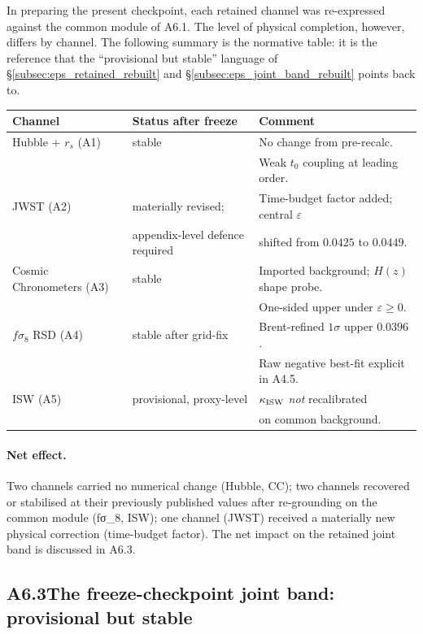 In preparing the present checkpoint, each retained channel was
re-expressed against the common module of A6.1. The level of
physical completion, however, differs by channel. The following
summary is the normative table: it is the reference that the
``provisional but stable'' language of
\S\ref{subsec:eps_retained_rebuilt} and
\S\ref{subsec:eps_joint_band_rebuilt} points back to.
\begin{center}
\begin{tabular}{|l|l|l|}
\hline
Channel & Status after freeze &
Comment \\
\hline
Hubble + $r_s$ (A1) &
stable &
No change from pre-recalc. \\
& & Weak $t_0$ coupling at leading order. \\
\hline
JWST (A2) &
materially revised; &
Time-budget factor added; central $\varepsilon$ \\
& appendix-level defence required &
 shifted from $0.0425$ to $0.0449$. \\
\hline
Cosmic Chronometers (A3) &
stable &
Imported background; $H(z)$ shape probe. \\
& & One-sided upper under $\varepsilon \geq 0$. \\
\hline
$f\sigma_8$ RSD (A4) &
stable after grid-fix &
Brent-refined $1\sigma$ upper
$0.0396$. \\
& & Raw negative best-fit explicit in A4.5. \\
\hline
ISW (A5) &
provisional, proxy-level &
$\kappa_{\rm ISW}$ \emph{not} recalibrated \\
& & on common background. \\
\hline
\end{tabular}
\end{center}
\paragraph{Net effect.}
Two channels carried no numerical change (Hubble, CC); two
channels recovered or stabilised at their previously published
values after re-grounding on the common module (fσ_8, ISW); one
channel (JWST) received a materially new physical correction
(time-budget factor). The net impact on the retained joint band
is discussed in A6.3.

\subsection*{A6.3\quad The freeze-checkpoint joint band: provisional
but stable}

